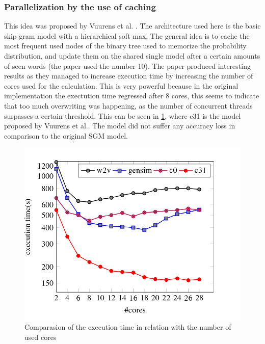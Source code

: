 {\subsubsection{Parallelization by the use of caching}
This idea was proposed by Vuurens et al. \cite{efficient}. The architecture used here is the basic skip gram model with a hierarchical soft max.  The general idea is to cache the most frequent used nodes of the binary tree used to memorize the probability distribution, and update them on the shared single model after a certain amounts of seen words (the paper used the number 10). The paper produced interesting results as they managed to increase execution time by increasing the number of cores used for the calculation. This is very powerful because in the original implementation the exectution time regressed after 8 cores, this seems to indicate that too much overwriting was happening, as the number of concurrent threads surpasses a certain threshold. This can be seen in \ref{fig:efficient}, where c31 is the model proposed by Vuurens et al.\cite{efficient}. The model did not suffer any accuracy loss in comparison to the original SGM model. 
\begin{figure}[ht]
    \centering
			\includegraphics[scale=0.3]{images/cachingEfficiency.png} 
    \caption{Comparasion of the execution time in relation with the number of used cores \cite{efficient}}
    \label{fig:efficient}
\end{figure}



}
